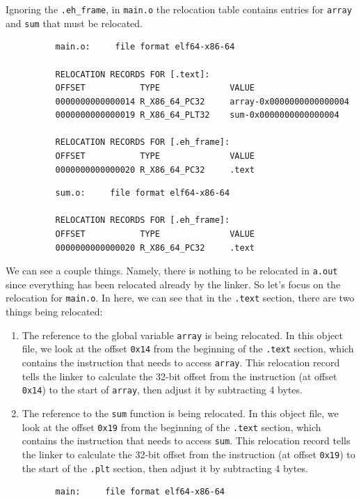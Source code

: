\documentclass{article}
\begin{document}
      \begin{example}
        Ignoring the \texttt{.eh\_frame}, in \texttt{main.o} the relocation table contains entries for \texttt{array} and \texttt{sum} that must be relocated. 
        \begin{lstlisting}
          main.o:     file format elf64-x86-64

          RELOCATION RECORDS FOR [.text]:
          OFFSET           TYPE              VALUE 
          0000000000000014 R_X86_64_PC32     array-0x0000000000000004
          0000000000000019 R_X86_64_PLT32    sum-0x0000000000000004

          RELOCATION RECORDS FOR [.eh_frame]:
          OFFSET           TYPE              VALUE 
          0000000000000020 R_X86_64_PC32     .text 
        \end{lstlisting}
        \begin{lstlisting}
          sum.o:     file format elf64-x86-64

          RELOCATION RECORDS FOR [.eh_frame]:
          OFFSET           TYPE              VALUE 
          0000000000000020 R_X86_64_PC32     .text
        \end{lstlisting}
        We can see a couple things. Namely, there is nothing to be relocated in \texttt{a.out} since everything has been relocated already by the linker. So let's focus on the relocation for \texttt{main.o}. In here, we can see that in the \texttt{.text} section, there are two things being relocated: 
        \begin{enumerate}
          \item The reference to the global variable \texttt{array} is being relocated. In this object file, we look at the offset \texttt{0x14} from the beginning of the \texttt{.text} section, which contains the instruction that needs to access \texttt{array}. This relocation record tells the linker to calculate the 32-bit offset from the instruction (at offset \texttt{0x14}) to the start of \texttt{array}, then adjust it by subtracting 4 bytes. 

          \item The reference to the \texttt{sum} function is being relocated. In this object file, we look at the offset \texttt{0x19} from the beginning of the \texttt{.text} section, which contains the instruction that needs to access \texttt{sum}. This relocation record tells the linker to calculate the 32-bit offset from the instruction (at offset \texttt{0x19}) to the start of the \texttt{.plt} section, then adjust it by subtracting 4 bytes.
        \end{enumerate}
        \begin{lstlisting}
          main:     file format elf64-x86-64 
        \end{lstlisting}
      \end{example}
       
\end{document}
